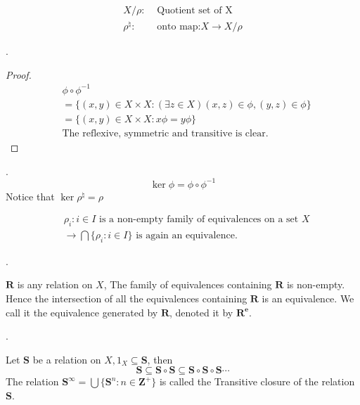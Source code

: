 \begin{Sym}
    \begin{align*}
        X/\rho :&\text{ Quotient set of X}  \\
        \rho^{\natural} :&\text{ onto map:} X\rightarrow X/\rho 
    \end{align*}
\end{Sym}

\begin{Prop}.

\begin{proof}
    \begin{align*}
        &\phi \circ \phi^{-1} \\
        &=\{(x,y)\in X\times X: (\exists z\in X)(x,z)\in \phi ,(y,z)\in \phi\}   \\
        &=\{(x,y)\in X\times X: x\phi =y\phi \} \\
        &\text{The reflexive, symmetric and transitive is clear.}
    \end{align*}
\end{proof}
\end{Prop}

\begin{Def}.
    \[\ker \phi =\phi \circ \phi^{-1}\]
    Notice that $\ker \rho^{\natural} =\rho $ 
\end{Def}

\begin{Rmk}
    \begin{align*}
        &{\rho_i:i\in I} \text{ is a non-empty family of equivalences on a set } X   \\ 
        &\rightarrow \bigcap\{\rho_i:i\in I\}\text{ is again an equivalence.}
    \end{align*}
\end{Rmk}

\begin{Def}[$\mathbf{R^e}$].

    $\mathbf{R}$ is any relation on $X$, The family of equivalences containing $\mathbf{R}$ is non-empty. Hence the intersection of all the equivalences containing $\mathbf{R}$ is an equivalence. We call it the equivalence generated by $\mathbf{R}$, denoted it by $\mathbf{R^e}$.
\end{Def}

\begin{Def}.

    Let $\mathbf{S}$ be a relation on $X, 1_X \subseteq \mathbf{S}$, then
    \[
        \mathbf{S}\subseteq \mathbf{S}\circ \mathbf{S}\subseteq \mathbf{S}\circ \mathbf{S}\circ \mathbf{S}\cdots 
    \]
    The relation $\mathbf{S}^{\infty}=\bigcup\{\mathbf{S}^n: n\in \mathbf{Z}^+\}$ is called the Transitive closure of the relation $\mathbf{S}$.
\end{Def}

